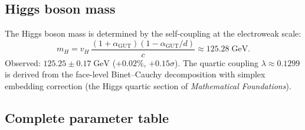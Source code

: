 \subsection{Higgs boson mass}

The Higgs boson mass is determined by the self-coupling at the electroweak scale:
\begin{equation}
m_H = v_H\,\frac{(1+\alpha_\text{GUT})(1-\alpha_\text{GUT}/d)}{c} \approx 125.28\;\text{GeV}.
\end{equation}
Observed: $125.25 \pm 0.17\;\text{GeV}$ ($+0.02\%$, $+0.15\sigma$).  The quartic coupling $\lambda \approx 0.1299$ is derived from the face-level Binet--Cauchy decomposition with simplex embedding correction (the Higgs quartic section of \textit{Mathematical Foundations}).

\subsection{Complete parameter table}

